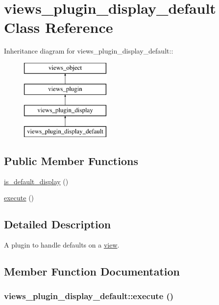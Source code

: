 \hypertarget{classviews__plugin__display__default}{
\section{views\_\-plugin\_\-display\_\-default Class Reference}
\label{classviews__plugin__display__default}
}
Inheritance diagram for views\_\-plugin\_\-display\_\-default::\begin{figure}[H]
\begin{center}
\leavevmode
\includegraphics[height=4cm]{classviews__plugin__display__default}
\end{center}
\end{figure}
\subsection*{Public Member Functions}
\begin{CompactItemize}
\item 
\hyperlink{classviews__plugin__display__default_721b29f71ff0536dfcf28831e4b96e72}{is\_\-default\_\-display} ()
\item 
\hyperlink{classviews__plugin__display__default_cceee9203c7f628f686147944442fecd}{execute} ()
\end{CompactItemize}


\subsection{Detailed Description}
A plugin to handle defaults on a \hyperlink{classview}{view}. 

\subsection{Member Function Documentation}
\hypertarget{classviews__plugin__display__default_cceee9203c7f628f686147944442fecd}{
\subsubsection[{execute}]{\setlength{\rightskip}{0pt plus 5cm}views\_\-plugin\_\-display\_\-default::execute ()}}
\label{classviews__plugin__display__default_cceee9203c7f628f686147944442fecd}


